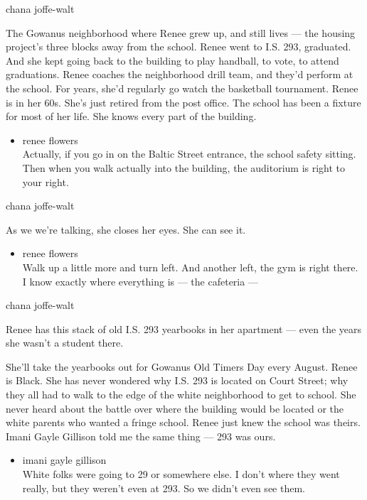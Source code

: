 chana joffe-walt

The Gowanus neighborhood where Renee grew up, and still lives --- the
housing project's three blocks away from the school. Renee went to I.S.
293, graduated. And she kept going back to the building to play
handball, to vote, to attend graduations. Renee coaches the neighborhood
drill team, and they'd perform at the school. For years, she'd regularly
go watch the basketball tournament. Renee is in her 60s. She's just
retired from the post office. The school has been a fixture for most of
her life. She knows every part of the building.

\begin{itemize}
\tightlist
\item
  renee flowers\\
  Actually, if you go in on the Baltic Street entrance, the school
  safety sitting. Then when you walk actually into the building, the
  auditorium is right to your right.
\end{itemize}

chana joffe-walt

As we we're talking, she closes her eyes. She can see it.

\begin{itemize}
\tightlist
\item
  renee flowers\\
  Walk up a little more and turn left. And another left, the gym is
  right there. I know exactly where everything is --- the cafeteria ---
\end{itemize}

chana joffe-walt

Renee has this stack of old I.S. 293 yearbooks in her apartment --- even
the years she wasn't a student there.

She'll take the yearbooks out for Gowanus Old Timers Day every August.
Renee is Black. She has never wondered why I.S. 293 is located on Court
Street; why they all had to walk to the edge of the white neighborhood
to get to school. She never heard about the battle over where the
building would be located or the white parents who wanted a fringe
school. Renee just knew the school was theirs. Imani Gayle Gillison told
me the same thing --- 293 was ours.

\begin{itemize}
\tightlist
\item
  imani gayle gillison\\
  White folks were going to 29 or somewhere else. I don't where they
  went really, but they weren't even at 293. So we didn't even see them.
\end{itemize}

